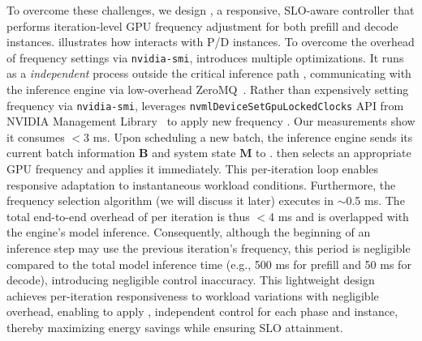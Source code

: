 To overcome these challenges, we design \governor, a responsive, SLO-aware controller that performs iteration-level GPU frequency adjustment for both prefill and decode instances. 
 illustrates how \governor interacts with P/D instances.
To overcome the overhead of frequency settings via \texttt{nvidia-smi}, \governor introduces multiple optimizations.
It runs as a \textit{independent} process outside the critical inference path , communicating with the inference engine via low-overhead ZeroMQ~\cite{zeromq}. 
Rather than expensively setting frequency via \texttt{nvidia-smi}, \governor leverages \texttt{nvmlDeviceSetGpuLockedClocks} API from NVIDIA Management Library~\cite{nvml} to apply new frequency .
Our measurements show it consumes $<$3 ms.
Upon scheduling a new batch, the inference engine sends its current batch information $\mathbf{B}$ and system state $\mathbf{M}$ to \governor.
\governor then selects an appropriate GPU frequency and applies it immediately. 
This per-iteration loop enables responsive adaptation to instantaneous workload conditions.
Furthermore, the frequency selection algorithm (we will discuss it later) executes in $\sim$0.5 ms.
The total end-to-end overhead of \governor per iteration is thus $<$4 ms and is overlapped with the engine's model inference.
Consequently, although the beginning of an inference step may use the previous iteration's frequency, this period is negligible compared to the total model inference time (e.g., 500 ms for prefill and 50 ms for decode), introducing negligible control inaccuracy.
This lightweight design achieves per-iteration responsiveness to workload variations with negligible overhead, enabling \governor to apply , independent control for each phase and instance, 
thereby maximizing energy savings while ensuring SLO attainment.

